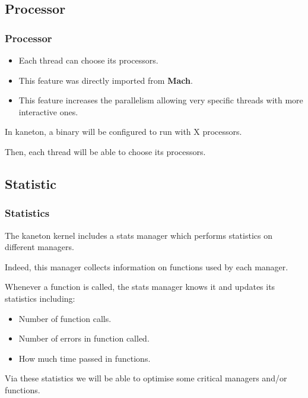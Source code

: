 %
%

\subsection{Processor}


\begin{frame}
  \frametitle{Processor}

  \begin{itemize}
    \item
      Each thread can choose its processors.
    \item
      This feature was directly imported from \textbf{Mach}.
    \item
      This feature increases the parallelism allowing very
      specific threads with more interactive ones.
  \end{itemize}

  \nl

  In kaneton, a binary will be configured to run with X processors.

  \nl

  Then, each thread will be able to choose its processors.
\end{frame}

%
%

\subsection{Statistic}


\begin{frame}
  \frametitle{Statistics}

  The kaneton kernel includes a stats manager which performs statistics
  on different managers.

  \nl

  Indeed, this manager collects information on functions used by each
  manager.

  \nl

  Whenever a function is called, the stats manager knows it and updates
  its statistics including:

  \begin{itemize}[<+->]
    \item
      Number of function calls.
    \item
      Number of errors in function called.
    \item
      How much time passed in functions.
  \end{itemize}

  \nl

  Via these statistics we will be able to optimise some critical managers
  and/or functions.
\end{frame}

